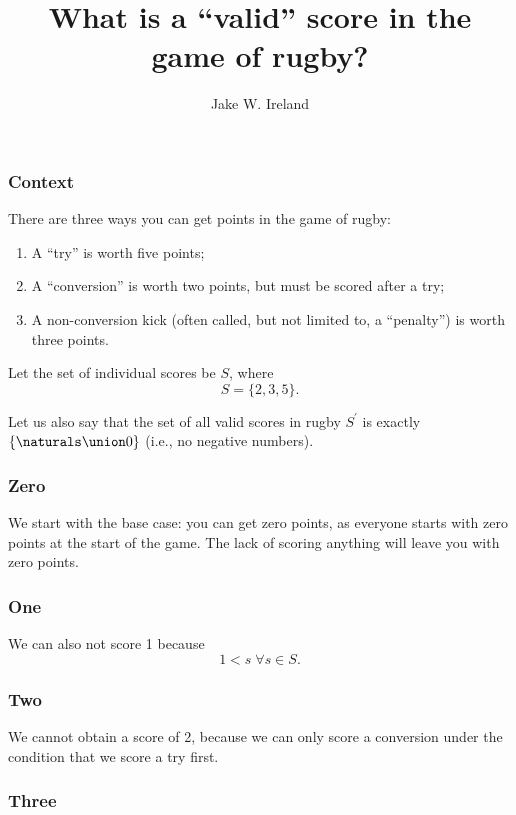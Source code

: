 \documentclass{arteacle}
\title{What is a ``valid'' score in the game of rugby?}
\author{Jake W. Ireland}
\begin{document}
\subsubsection*{Context}

There are three ways you can get points in the game of rugby:
\begin{enumerate}
	\item A ``try'' is worth five points;
	\item A ``conversion'' is worth two points, but must be scored after a try;
	\item A non-conversion kick (often called, but not limited to, a ``penalty'') is worth three points.
\end{enumerate}

Let the set of individual scores be $S$, where
\begin{equation}
	S = \{2, 3, 5\}.
\end{equation}

Let us also say that the set of all valid scores in rugby $S^\prime$ is exactly $\{\naturals\union 0\}$ (i.e., no negative numbers).


\subsubsection*{Zero}

We start with the base case: you can get zero points, as everyone starts with zero points at the start of the game.  The lack of scoring anything will leave you with zero points.

\subsubsection*{One}

We can also not score 1 because
\begin{equation}
	1 < s\;\forall s\in S.
\end{equation}

\subsubsection*{Two}

We cannot obtain a score of 2, because we can only score a conversion under the condition that we score a try first.

\subsubsection*{Three}
\end{document}
